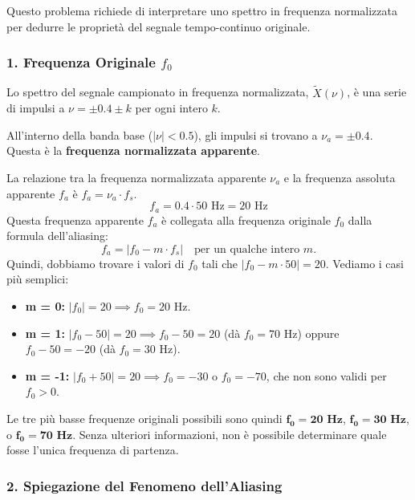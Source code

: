 
\begin{soluzione}{17}
    Questo problema richiede di interpretare uno spettro in frequenza normalizzata per dedurre le proprietà del segnale tempo-continuo originale.

    \subsubsection*{1. Frequenza Originale $f_0$}
    
    Lo spettro del segnale campionato in frequenza normalizzata, $\tilde{X}(\nu)$, è una serie di impulsi a $\nu = \pm 0.4 \pm k$ per ogni intero $k$.
    
    All'interno della banda base ($|\nu| < 0.5$), gli impulsi si trovano a $\nu_a = \pm 0.4$. Questa è la \textbf{frequenza normalizzata apparente}.
    
    La relazione tra la frequenza normalizzata apparente $\nu_a$ e la frequenza assoluta apparente $f_a$ è $f_a = \nu_a \cdot f_s$.
    \[
        f_a = 0.4 \cdot 50 \text{ Hz} = 20 \text{ Hz}
    \]
    Questa frequenza apparente $f_a$ è collegata alla frequenza originale $f_0$ dalla formula dell'aliasing:
    \[
        f_a = |f_0 - m \cdot f_s| \quad \text{per un qualche intero } m.
    \]
    Quindi, dobbiamo trovare i valori di $f_0$ tali che $|f_0 - m \cdot 50| = 20$. Vediamo i casi più semplici:
    \begin{itemize}
        \item \textbf{m = 0:} $|f_0| = 20 \implies f_0 = 20$ Hz.
        \item \textbf{m = 1:} $|f_0 - 50| = 20 \implies f_0 - 50 = 20$ (dà $f_0 = 70$ Hz) oppure $f_0 - 50 = -20$ (dà $f_0 = 30$ Hz).
        \item \textbf{m = -1:} $|f_0 + 50| = 20 \implies f_0 = -30$ o $f_0 = -70$, che non sono validi per $f_0 > 0$.
    \end{itemize}
    Le tre più basse frequenze originali possibili sono quindi $\mathbf{f_0 = 20 \text{ Hz}}$, $\mathbf{f_0 = 30 \text{ Hz}}$, o $\mathbf{f_0 = 70 \text{ Hz}}$. Senza ulteriori informazioni, non è possibile determinare quale fosse l'unica frequenza di partenza.

    \subsubsection*{2. Spiegazione del Fenomeno dell'Aliasing}
    

\end{soluzione}
